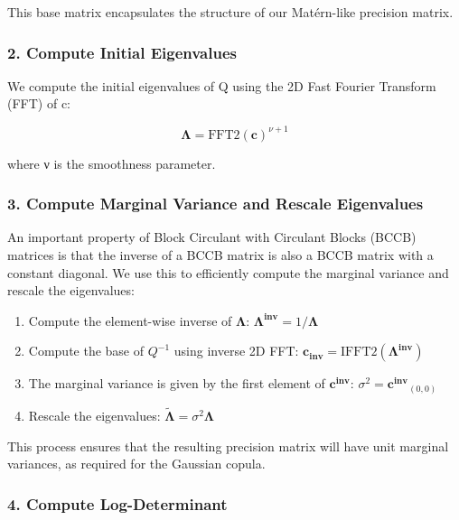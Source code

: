 \documentclass[journal=,manuscript=]{achemso}
\providecommand{\tightlist}{%
  \setlength{\itemsep}{0pt}\setlength{\parskip}{0pt}}\usepackage{longtable,booktabs,array}
\begin{document}
This base matrix encapsulates the structure of our Matérn-like precision
matrix.

\subsubsection{2. Compute Initial
Eigenvalues}\label{compute-initial-eigenvalues}

We compute the initial eigenvalues of Q using the 2D Fast Fourier
Transform (FFT) of c:

\[
\boldsymbol{\Lambda} = \text{FFT2}(\mathbf{c})^{\nu+1}
\]

where ν is the smoothness parameter.

\subsubsection{3. Compute Marginal Variance and Rescale
Eigenvalues}\label{compute-marginal-variance-and-rescale-eigenvalues}

An important property of Block Circulant with Circulant Blocks (BCCB)
matrices is that the inverse of a BCCB matrix is also a BCCB matrix with
a constant diagonal. We use this to efficiently compute the marginal
variance and rescale the eigenvalues:

\begin{enumerate}
\def\labelenumi{\alph{enumi}.}
\tightlist
\item
  Compute the element-wise inverse of \(\boldsymbol{\Lambda}\):
  \(\mathbf{\Lambda^{inv}} = 1 / \boldsymbol{\Lambda}\)
\item
  Compute the base of \(Q^{-1}\) using inverse 2D FFT:
  \(\mathbf{c_{inv}} = \text{IFFT2}(\mathbf{{\Lambda^{inv}}})\)
\item
  The marginal variance is given by the first element of
  \(\mathbf{c^{inv}}\): \(\sigma^2 = \mathbf{c^{inv}}_{(0,0)}\)
\item
  Rescale the eigenvalues:
  \(\boldsymbol{\tilde \Lambda} = \sigma^2 \boldsymbol{\Lambda}\)
\end{enumerate}

This process ensures that the resulting precision matrix will have unit
marginal variances, as required for the Gaussian copula.

\subsubsection{4. Compute
Log-Determinant}\label{compute-log-determinant}
\end{document}
